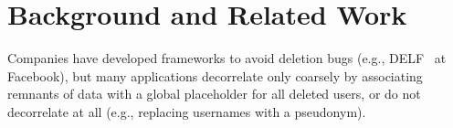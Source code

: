 \section{Background and Related Work}

Companies have developed frameworks to avoid deletion bugs (e.g., DELF~\cite{delf} at Facebook), but many
applications decorrelate only coarsely by associating remnants of data with a global placeholder for
all deleted users, or do not decorrelate at all (e.g., replacing usernames with a pseudonym).

